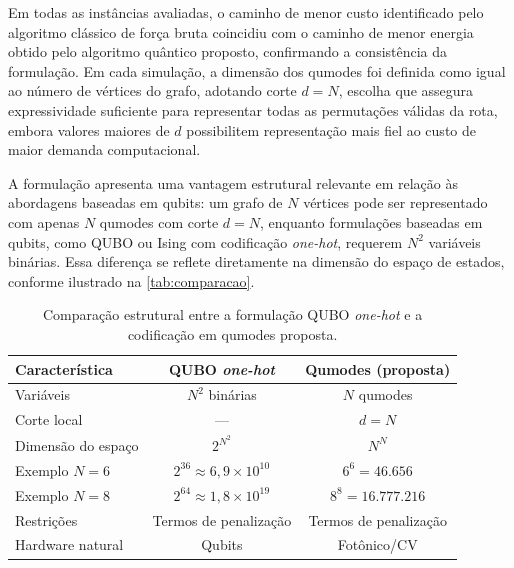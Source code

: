     Em todas as instâncias avaliadas, o caminho de menor custo identificado pelo algoritmo clássico de força bruta coincidiu com o caminho de menor energia obtido pelo algoritmo quântico proposto, confirmando a consistência da formulação. Em cada simulação, a dimensão dos qumodes foi definida como igual ao número de vértices do grafo, adotando corte $d = N$, escolha que assegura expressividade suficiente para representar todas as permutações válidas da rota, embora valores maiores de $d$ possibilitem representação mais fiel ao custo de maior demanda computacional.


    A formulação apresenta uma vantagem estrutural relevante em relação às abordagens baseadas em qubits: um grafo de $N$ vértices pode ser representado com apenas $N$ qumodes com corte $d = N$, enquanto formulações baseadas em qubits, como QUBO ou Ising com codificação \textit{one-hot}, requerem $N^2$ variáveis binárias. Essa diferença se reflete diretamente na dimensão do espaço de estados, conforme ilustrado na \autoref{tab:comparacao}.

    \begin{table}[!htbp]
        \centering
        \caption{Comparação estrutural entre a formulação QUBO \textit{one-hot} 
        e a codificação em qumodes proposta.}
        \label{tab:comparacao}
        \begin{tabular}{lcc}
        \hline
        \textbf{Característica} & \textbf{QUBO \textit{one-hot}} & 
        \textbf{Qumodes (proposta)} \\
        \hline
        Variáveis & $N^2$ binárias & $N$ qumodes \\
        Corte local & --- & $d = N$ \\
        Dimensão do espaço & $2^{N^2}$ & $N^N$ \\
        Exemplo $N=6$ & $2^{36} \approx 6{,}9 \times 10^{10}$ & 
        $6^6 = 46.656$ \\
        Exemplo $N=8$ & $2^{64} \approx 1{,}8 \times 10^{19}$ & 
        $8^8 = 16.777.216$ \\
        Restrições & Termos de penalização & Termos de penalização \\
        Hardware natural & Qubits & Fotônico/CV \\
        \hline
        \end{tabular}
    \end{table}

